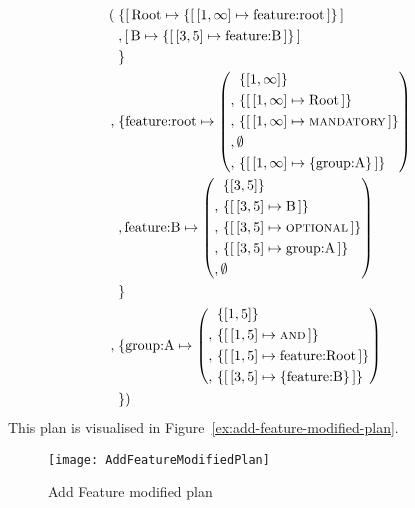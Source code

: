 \begin{align*}
  (&\; \{  \mapping{\text{Root}}{\set{\intervalmapping{1}{\forever}{\text{feature:root}}}} \\
    &\; ,  \mapping{\text{B}}{\set{\intervalmapping{3}{5}{\text{feature:B}}}} \\
    &\; \}\\
    ,&\; \{  \text{feature:root} \mapsto \left( \begin{aligned}
          \, & \set{\interval{1}{\forever}} \\
       ,  \, & \set{\intervalmapping{1}{\forever}{\text{Root}}} \\
       ,  \, & \set{\intervalmapping{1}{\forever}{\mandatory}} \\
       ,  \, & \emptyset \\
       ,  \, & \set{\intervalmapping{1}{\forever}{\set{\text{group:A}}}} \\
  \end{aligned}\right) \\
    &\; , \text{feature:B} \mapsto \left( \begin{aligned}
          \, & \set{\interval{3}{5}} \\
       ,  \, & \set{\intervalmapping{3}{5}{\text{B}}} \\
       ,  \, & \set{\intervalmapping{3}{5}{\optional}} \\
       ,  \, & \set{\intervalmapping{3}{5}{\text{group:A}}} \\
       ,  \, & \emptyset \\
  \end{aligned}\right) \\
   &\; \}\\ 
          ,& \; \{ \text{group:A} \mapsto \left( \begin{aligned}
                & \set{\interval{1}{5}} \\
                , \, & \set{\intervalmapping{1}{5}{\andtype}} \\
                , \, & \set{\intervalmapping{1}{5}{\text{feature:Root}}} \\
                , \, & \set{\intervalmapping{3}{5}{\set{\text{feature:B}}}} \\
            \end{aligned} \right) \\
   &\; \})
\end{align*}
This plan is visualised in Figure~\vref{ex:add-feature-modified-plan}.

\begin{figure}[hpbt]
  \centering
  \texttt{[image: AddFeatureModifiedPlan]}
  \caption{Add Feature \textemdash{} modified plan}
  \label{ex:add-feature-modified-plan}
\end{figure}

